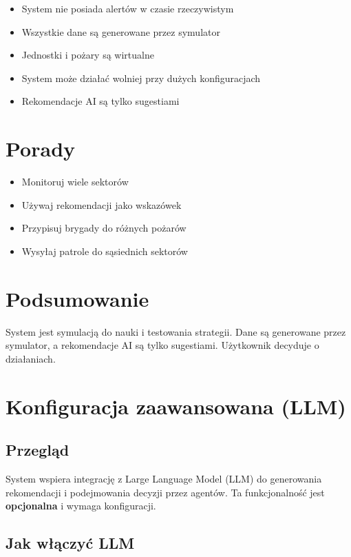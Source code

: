 \documentclass[11pt,a4paper]{article}
\begin{document}
\begin{itemize}
    \item System nie posiada alertów w czasie rzeczywistym
    \item Wszystkie dane są generowane przez symulator
    \item Jednostki i pożary są wirtualne
    \item System może działać wolniej przy dużych konfiguracjach
    \item Rekomendacje AI są tylko sugestiami
\end{itemize}

\section{Porady}

\begin{itemize}
    \item Monitoruj wiele sektorów
    \item Używaj rekomendacji jako wskazówek
    \item Przypisuj brygady do różnych pożarów
    \item Wysyłaj patrole do sąsiednich sektorów
\end{itemize}

\section{Podsumowanie}

System jest symulacją do nauki i testowania strategii. Dane są generowane przez symulator, a rekomendacje AI są tylko sugestiami. Użytkownik decyduje o działaniach.

\section{Konfiguracja zaawansowana (LLM)}

\subsection{Przegląd}

System wspiera integrację z Large Language Model (LLM) do generowania rekomendacji i podejmowania decyzji przez agentów. Ta funkcjonalność jest \textbf{opcjonalna} i wymaga konfiguracji.

\subsection{Jak włączyć LLM}
\end{document}
